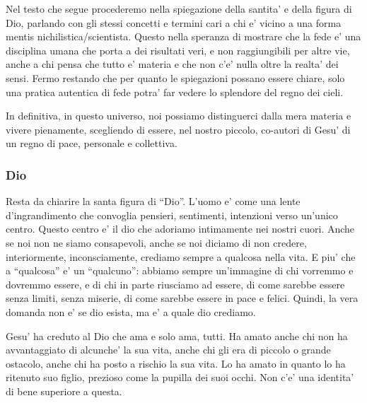 Nel testo che segue procederemo nella spiegazione della santita' e della figura di Dio, parlando con gli stessi concetti e termini cari a chi e' vicino a una forma mentis nichilistica/scientista. Questo nella speranza di mostrare che la fede e' una disciplina umana che porta a dei risultati veri, e non raggiungibili per altre vie, anche a chi pensa che tutto e' materia e che non c'e' nulla oltre la realta' dei sensi. Fermo restando che per quanto le spiegazioni possano essere chiare, solo una pratica autentica di fede potra' far vedere lo splendore del regno dei cieli.

In definitiva, in questo universo, noi possiamo distinguerci dalla mera materia e vivere pienamente, scegliendo di essere, nel nostro piccolo, co-autori di Gesu' di un regno di pace, personale e collettiva. 

\subsubsection{Dio}

Resta da chiarire la santa figura di ``Dio''. L'uomo e' come una lente d'ingrandimento che convoglia pensieri, sentimenti, intenzioni verso un'unico centro. Questo centro e' il dio che adoriamo intimamente nei nostri cuori. Anche se noi non ne siamo consapevoli, anche se noi diciamo di non credere, interiormente, inconsciamente, crediamo sempre a qualcosa nella vita. E piu' che a ``qualcosa'' e' un ``qualcuno'': abbiamo sempre un'immagine di chi vorremmo e dovremmo essere, e di chi in parte riusciamo ad essere, di come sarebbe essere senza limiti, senza miserie, di come sarebbe essere in pace e felici. Quindi, la vera domanda non e' se dio esista, ma e' a quale dio crediamo.

Gesu' ha creduto al Dio che ama e solo ama, tutti. Ha amato anche chi non ha avvantaggiato di alcunche' la sua vita, anche chi gli era di piccolo o grande ostacolo, anche chi ha posto a rischio la sua vita. Lo ha amato in quanto lo ha ritenuto suo figlio, prezioso come la pupilla dei suoi occhi. Non c'e' una identita' di bene superiore a questa.


